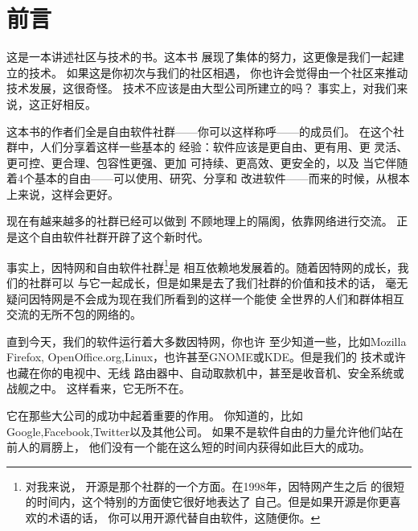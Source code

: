 ﻿\section*{前言}

这是一本讲述社区与技术的书。这本书
展现了集体的努力，这更像是我们一起建立的技术。
如果这是你初次与我们的社区相遇，
你也许会觉得由一个社区来推动技术发展，这很奇怪。
技术不应该是由大型公司所建立的吗？
事实上，对我们来说，这正好相反。

这本书的作者们全是自由软件社群——你可以这样称呼——的成员们。
在这个社群中，人们分享着这样一些基本的
经验：软件应该是更自由、更有用、更
灵活、更可控、更合理、包容性更强、更加
可持续、更高效、更安全的，以及
当它伴随着4个基本的自由——可以使用、研究、分享和
改进软件——而来的时候，从根本上来说，这样会更好。

现在有越来越多的社群已经可以做到
不顾地理上的隔阂，依靠网络进行交流。
正是这个自由软件社群开辟了这个新时代。

事实上，因特网和自由软件社群\footnote{对我来说，
  开源是那个社群的一个方面。在1998年，因特网产生之后
  的很短的时间内，这个特别的方面使它很好地表达了
  自己。但是如果开源是你更喜欢的术语的话，
  你可以用开源代替自由软件，这随便你。}是
相互依赖地发展着的。随着因特网的成长，我们的社群可以
与它一起成长，但是如果是去了我们社群的价值和技术的话，
毫无疑问因特网是不会成为现在我们所看到的这样一个能使
全世界的人们和群体相互交流的无所不包的网络的。

直到今天，我们的软件运行着大多数因特网，你也许
至少知道一些，比如Mozilla Firefox,
OpenOffice.org,Linux，也许甚至GNOME或KDE。但是我们的
技术或许也藏在你的电视中、无线
路由器中、自动取款机中，甚至是收音机、安全系统或战舰之中。
这样看来，它无所不在。

它在那些大公司的成功中起着重要的作用。
你知道的，比如Google,Facebook,Twitter以及其他公司。
如果不是软件自由的力量允许他们站在前人的肩膀上，
他们没有一个能在这么短的时间内获得如此巨大的成功。